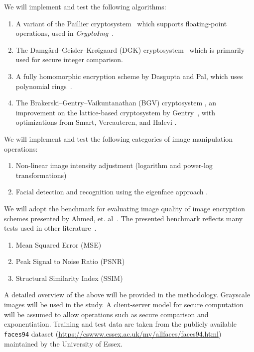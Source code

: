 We will implement and test the following algorithms:
\begin{enumerate}
	\item A variant of the Paillier cryptosystem~\cite{stern_public-key_1999} which supports floating-point operations, used in \textit{CryptoImg}~\cite{ziad_cryptoimg:_2016}.
    \item The Damg{\aa}rd--Geisler--Kr{\o}igaard (DGK) cryptosystem~\cite{pieprzyk_efficient_2007, cryptoeprint:2008:321} which is primarily used for secure integer comparison.
	\item A fully homomorphic encryption scheme by Dasgupta and Pal, which uses polynomial rings~\cite{dasgupta_design_2016}.
	\item The Brakerski--Gentry--Vaikuntanathan (BGV) cryptosystem \cite{cryptoeprint:2011:277}, an improvement on the lattice-based cryptosystem by Gentry~\cite{gentry_fully_2009}, with optimizations from Smart, Vercauteren, and Halevi \cite{hutchison_fully_2010, cryptoeprint:2011:566}.
\end{enumerate}
We will implement and test the following categories of image manipulation operations:
\begin{enumerate}
	\item Non-linear image intensity adjustment (logarithm and power-log transformations)
	\item Facial detection and recognition using the eigenface approach \cite{turk_eigenfaces_1991}.
\end{enumerate}
We will adopt the benchmark for evaluating image quality of image encryption schemes presented by Ahmed, et. al~\cite{ahmed_benchmark_2016}. The presented benchmark reflects many tests used in other literature~\cite{ahmad_efficiency_2012, wu_npcr_2011}.
\begin{enumerate}
    \item Mean Squared Error (MSE)
    \item Peak Signal to Noise Ratio (PSNR)
    \item Structural Similarity Index (SSIM)
\end{enumerate}
A detailed overview of the above will be provided in the methodology. Grayscale images will be used in the study.
A client-server model for secure computation will be assumed to allow operations such as secure comparison and exponentiation.
Training and test data are taken from the publicly available \texttt{faces94} dataset (\url{https://cswww.essex.ac.uk/mv/allfaces/faces94.html}) maintained by the University of Essex. 


